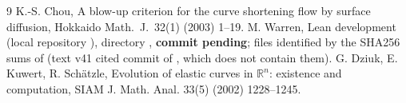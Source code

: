 \documentclass[11pt]{article}
\begin{document}
\begin{thebibliography}{9}
 K.-S. Chou, A blow-up criterion for the curve shortening flow by surface diffusion, Hokkaido Math.\ J.\ 32(1) (2003) 1--19.
 M. Warren, Lean development  (local repository ), directory , \textbf{commit pending}; files identified by the SHA256 sums of  (text v41 cited commit  of , which does not contain them).
 G. Dziuk, E. Kuwert, R. Sch{\"a}tzle, Evolution of elastic curves in $\mathbb R^n$: existence and computation, SIAM J. Math. Anal. 33(5) (2002) 1228--1245.
\end{thebibliography}
\end{document}
